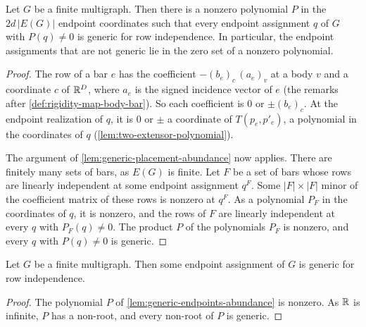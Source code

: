 \begin{lemma}
  \label{lem:generic-endpoints-abundance}
  \leanok
  Let $G$ be a finite multigraph. Then there is a nonzero polynomial
  $P$ in the $2d\,|E(G)|$ endpoint coordinates such that every
  endpoint assignment $q$ of $G$ with $P(q) \neq 0$ is generic for row
  independence. In particular, the endpoint assignments that are not
  generic lie in the zero set of a nonzero polynomial.
\end{lemma}
\begin{proof}
  \leanok
  The row of a bar $e$ has the coefficient $-(b_e)_c\,(a_e)_v$ at a
  body $v$ and a coordinate $c$ of ${\mathbb{R}}^D$, where $a_e$ is the signed
  incidence vector of $e$ (the remarks after
  \cref{def:rigidity-map-body-bar}). So each coefficient is $0$ or
  $\pm (b_e)_c$. At the endpoint realization of $q$, it is $0$ or
  $\pm$ a coordinate of $T(p_e, p'_e)$, a polynomial in the coordinates
  of $q$ (\cref{lem:two-extensor-polynomial}).

  The argument of \cref{lem:generic-placement-abundance} now applies.
  There are finitely many sets of bars, as $E(G)$ is finite. Let $F$
  be a set of bars whose rows are linearly independent at some
  endpoint assignment $q^F$. Some $|F| \times |F|$ minor of the
  coefficient matrix of these rows is nonzero at $q^F$. As a
  polynomial $P_F$ in the coordinates of $q$, it is nonzero, and the
  rows of $F$ are linearly independent at every $q$ with
  $P_F(q) \neq 0$. The product $P$ of the polynomials $P_F$ is
  nonzero, and every $q$ with $P(q) \neq 0$ is generic.
\end{proof}

\begin{lemma}
  \label{lem:exists-generic-endpoints}
  \leanok
  Let $G$ be a finite multigraph. Then some endpoint assignment of $G$
  is generic for row independence.
\end{lemma}
\begin{proof}
  \leanok
  The polynomial $P$ of \cref{lem:generic-endpoints-abundance} is
  nonzero. As ${\mathbb{R}}$ is infinite, $P$ has a non-root, and every non-root
  of $P$ is generic.
\end{proof}

